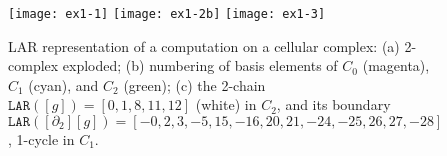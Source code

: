 \begin{example}
\begin{figure}[htbp] 
   \centering
   \texttt{[image: ex1-1]} 
   \texttt{[image: ex1-2b]} 
   \texttt{[image: ex1-3]} 
   \caption{LAR representation of a computation on  a cellular complex: (a) 2-complex exploded; (b) numbering of basis elements of $C_0$ (magenta), $C_1$ (cyan), and $C_2$ (green); (c) the 2-chain $\texttt{LAR}([g]) = [0,1,8,11,12]$ (white) in $C_2$, and its boundary  $\texttt{LAR}([\partial_2][g]) = [-0, 2, 3, -5,15,-16,20,21,-24,-25,26,27,-28]$, 1-cycle in $C_1$.}
   \label{fig:ex1}
\end{figure}

\end{example} %



